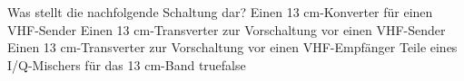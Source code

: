     {Was stellt die nachfolgende Schaltung dar?}
    {Einen 13 cm-Konverter für einen VHF-Sender}
    {Einen 13 cm-Transverter zur Vorschaltung vor einen VHF-Sender}
    {Einen 13 cm-Transverter zur Vorschaltung vor einen VHF-Empfänger}
    {Teile eines I/Q-Mischers für das 13 cm-Band}
    {true}{false}